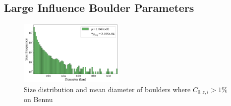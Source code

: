 \subsection{Large Influence Boulder Parameters}
\begin{figure}[H]
    \centering
    \includegraphics[width=0.45\textwidth]{fig/bennu_impact_size_new.png}
    \caption{Size distribution and mean diameter of boulders where $C_{0,z,i} > 1\%$ on Bennu}
    \label{fig:percents}
\end{figure}
